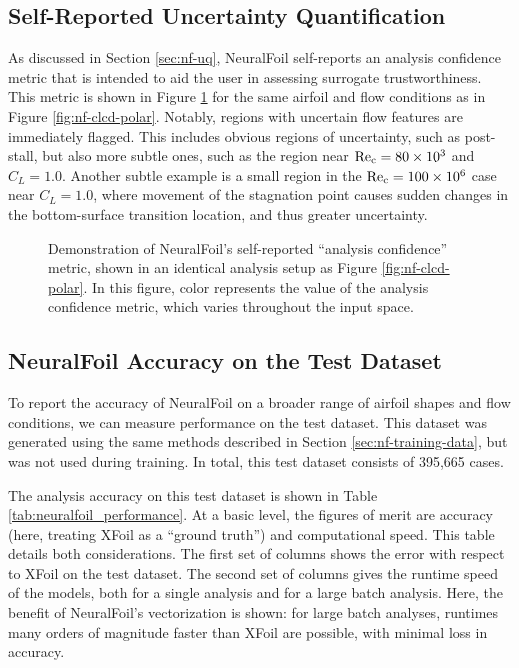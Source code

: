 \subsection{Self-Reported Uncertainty Quantification}
\label{sec:nf-uq-results}

As discussed in Section \ref{sec:nf-uq}, NeuralFoil self-reports an analysis confidence metric that is intended to aid the user in assessing surrogate trustworthiness. This metric is shown in Figure \ref{fig:clcd_polar_with_uq} for the same airfoil and flow conditions as in Figure \ref{fig:nf-clcd-polar}. Notably, regions with uncertain flow features are immediately flagged. This includes obvious regions of uncertainty, such as post-stall, but also more subtle ones, such as the region near $\rm Re_c=80 \times 10^3$ and $C_L=1.0$. Another subtle example is a small region in the $\rm Re_c=100 \times 10^6$ case near $C_L=1.0$, where movement of the stagnation point causes sudden changes in the bottom-surface transition location, and thus greater uncertainty.

\begin{figure}[H]
    \centering
    
    \caption{Demonstration of NeuralFoil's self-reported ``analysis confidence'' metric, shown in an identical analysis setup as Figure \ref{fig:nf-clcd-polar}. In this figure, color represents the value of the analysis confidence metric, which varies throughout the input space.}
    \label{fig:clcd_polar_with_uq}
\end{figure}

\subsection{NeuralFoil Accuracy on the Test Dataset}

To report the accuracy of NeuralFoil on a broader range of airfoil shapes and flow conditions, we can measure performance on the test dataset. This dataset was generated using the same methods described in Section \ref{sec:nf-training-data}, but was not used during training. In total, this test dataset consists of 395,665 cases.

The analysis accuracy on this test dataset is shown in Table \ref{tab:neuralfoil_performance}. At a basic level, the figures of merit are accuracy (here, treating XFoil as a ``ground truth'') and computational speed. This table details both considerations. The first set of columns shows the error with respect to XFoil on the test dataset. The second set of columns gives the runtime speed of the models, both for a single analysis and for a large batch analysis. Here, the benefit of NeuralFoil's vectorization is shown: for large batch analyses, runtimes many orders of magnitude faster than XFoil are possible, with minimal loss in accuracy.


